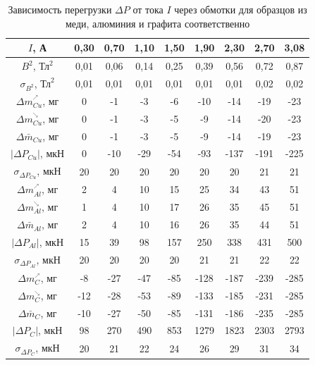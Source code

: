 \documentclass[a4paper,12pt]{article}
\begin{document}
\begin{table}[h]
	\centering
	\caption{Зависимость перегрузки $\Delta P$ от тока $I$ через обмотки для образцов из меди, алюминия и графита соответственно} \label{Измерения}
	\begin{tabular}{|c|c|c|c|c|c|c|c|c|}
		\hline
		$I$, А & 0,30 & 0,70 & 1,10 & 1,50 & 1,90 & 2,30 & 2,70 & 3,08 \\ \hline
		$B^2$, $\text{Тл}^2$ & 0,01 & 0,06 & 0,14 & 0,25 & 0,39 & 0,56 & 0,72 & 0,87 \\ \hline
		$\sigma_{B^2}$, $\text{Тл}^2$ & 0,01 & 0,01 & 0,01 & 0,01 & 0,01 & 0,01 & 0,02 & 0,02 \\ \hline
		\hline
		$\Delta m^{{}^{\nearrow}}_{Cu}$, мг & 0 & -1 & -3 & -6 & -10 & -14 & -19 & -23 \\ \hline
		$\Delta m^{{}^{\searrow}}_{Cu}$, мг & 0 & -1 & -3 & -5 & -9 & -14 & -20 & -23 \\ \hline
		$\Delta\bar{m}_{Cu}$, мг & 0 & -1 & -3 & -5 & -9 & -14 & -19 & -23 \\ \hline
		$\left|\Delta P_{Cu}\right|$, мкН & 0 & -10 & -29 & -54 & -93 & -137 & -191 & -225 \\ \hline
		$\sigma_{\Delta P_{Cu}}$, мкН & 20 & 20 & 20 & 20 & 20 & 20 & 21 & 21 \\ \hline
		\hline
		$\Delta m^{{}^{\nearrow}}_{Al}$, мг & 2 & 4 & 10 & 15 & 25 & 34 & 43 & 51 \\ \hline
		$\Delta m^{{}^{\searrow}}_{Al}$, мг & 1 & 4 & 10 & 17 & 26 & 35 & 45 & 51 \\ \hline
		$\Delta \bar{m}_{Al}$, мг & 2 & 4 & 10 & 16 & 26 & 35 & 44 & 51 \\ \hline
		$\left|\Delta P_{Al}\right|$, мкН & 15 & 39 & 98 & 157 & 250 & 338 & 431 & 500 \\ \hline
		$\sigma_{\Delta P_{Al}}$, мкН & 20 & 20 & 20 & 20 & 21 & 21 & 22 & 22 \\ \hline
		\hline
		$\Delta m^{{}_{\nearrow}}_{C}$, мг & -8 & -27 & -47 & -85 & -128 & -187 & -239 & -285 \\ \hline
		$\Delta m^{{}_{\searrow}}_{C}$, мг & -12 & -28 & -53 & -89 & -133 & -185 & -231 & -285 \\ \hline
		$\Delta\bar{m}_{C}$, мг & -10 & -27 & -50 & -85 & -131 & -186 & -235 & -285 \\ \hline
		$\left|\Delta P_{C}\right|$, мкН & 98 & 270 & 490 & 853 & 1279 & 1823 & 2303 & 2793 \\ \hline
		$\sigma_{\Delta P_{C}}$, мкН & 20 & 21 & 22 & 24 & 26 & 29 & 31 & 34 \\ \hline
	\end{tabular}
\end{table}   
\end{document}
